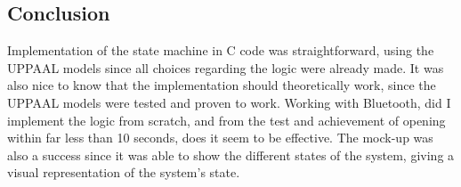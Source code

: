 \subsection{Conclusion}

Implementation of the state machine in C code was straightforward, using the UPPAAL models since all choices regarding the logic were already made.
It was also nice to know that the implementation should theoretically work, since the UPPAAL models were tested and proven to work.
Working with Bluetooth, did I implement the logic from scratch, and from the test and achievement of opening within far less than 10 seconds, does it seem to be effective.
The mock-up was also a success since it was able to show the different states of the system, giving a visual representation of the system's state.